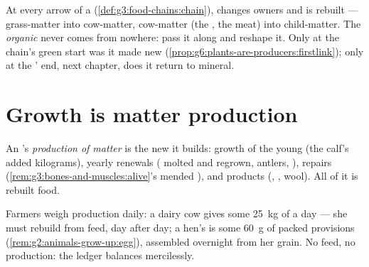 \begin{remark}\label{rem:g6:matter-from-food:hands}
At every arrow of a 
(\cref{def:g3:food-chains:chain}),  changes
owners and is rebuilt --- grass-matter into cow-matter,
cow-matter (the , the meat) into child-matter. The
\emph{organic} never comes from nowhere:  pass it
along and reshape it. Only at the chain's green start was it
made new (\cref{prop:g6:plants-are-producers:firstlink});
only at the ' end, next chapter, does it return
to mineral.
\end{remark}

\section{Growth is matter production}

\begin{definition}\label{def:g6:matter-from-food:production}
An 's \emph{production of matter} is the new  it builds: growth of the
young (the calf's added kilograms), yearly renewals (
molted and regrown, antlers, ), repairs
(\cref{rem:g3:bones-and-muscles:alive}'s mended ), and
products (, , wool). All of it is rebuilt food.
\end{definition}

\begin{example}\label{ex:g6:matter-from-food:weighing}
Farmers weigh production daily: a dairy cow gives some
\qty{25}{kg} of  a day ---  she must
rebuild from feed, day after day; a hen's  is some
\qty{60}{g} of packed provisions
(\cref{rem:g2:animals-grow-up:egg}), assembled overnight
from her grain. No feed, no production: the ledger balances
mercilessly.
\end{example}

